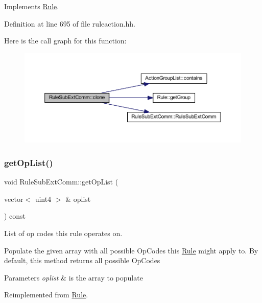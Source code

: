 Implements \mbox{\hyperlink{class_rule_a70de90a76461bfa7ea0b575ce3c11e4d}{Rule}}.



Definition at line 695 of file ruleaction.\+hh.

Here is the call graph for this function\+:
\nopagebreak
\begin{figure}[H]
\begin{center}
\leavevmode
\includegraphics[width=350pt]{class_rule_sub_ext_comm_ae11025cea865b30c65eb436fdb491f88_cgraph}
\end{center}
\end{figure}
\mbox{\label{class_rule_sub_ext_comm_ab1ae8c84d4b9d857a2c43715e8822e95}} 
\subsubsection{\texorpdfstring{getOpList()}{getOpList()}}
{\footnotesize\ttfamily void Rule\+Sub\+Ext\+Comm\+::get\+Op\+List (\begin{DoxyParamCaption}\item[{vector$<$ uint4 $>$ \&}]{oplist }\end{DoxyParamCaption}) const\hspace{0.3cm}{\ttfamily [virtual]}}



List of op codes this rule operates on. 

Populate the given array with all possible Op\+Codes this \mbox{\hyperlink{class_rule}{Rule}} might apply to. By default, this method returns all possible Op\+Codes 
\begin{DoxyParams}{Parameters}
{\em oplist} & is the array to populate \\
\hline
\end{DoxyParams}


Reimplemented from \mbox{\hyperlink{class_rule_a4023bfc7825de0ab866790551856d10e}{Rule}}.



